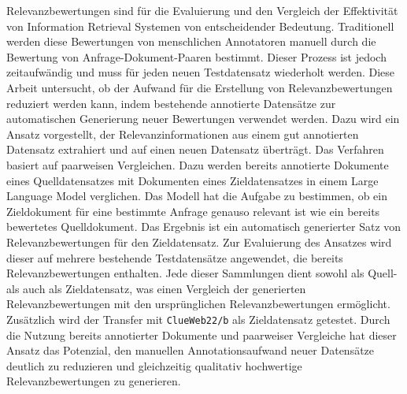 Relevanzbewertungen sind für die Evaluierung und den Vergleich der Effektivität von Information Retrieval Systemen von entscheidender Bedeutung. Traditionell werden diese Bewertungen von menschlichen Annotatoren manuell durch die Bewertung von Anfrage-Dokument-Paaren bestimmt. Dieser Prozess ist jedoch zeitaufwändig und muss für jeden neuen Testdatensatz wiederholt werden. Diese Arbeit untersucht, ob der Aufwand für die Erstellung von Relevanzbewertungen reduziert werden kann, indem bestehende annotierte Datensätze zur automatischen Generierung neuer Bewertungen verwendet werden. Dazu wird ein Ansatz vorgestellt, der Relevanzinformationen aus einem gut annotierten Datensatz extrahiert und auf einen neuen Datensatz überträgt. Das Verfahren basiert auf paarweisen Vergleichen. Dazu werden bereits annotierte Dokumente eines Quelldatensatzes mit Dokumenten eines Zieldatensatzes in einem Large Language Model verglichen. Das Modell hat die Aufgabe zu bestimmen, ob ein Zieldokument für eine bestimmte Anfrage genauso relevant ist wie ein bereits bewertetes Quelldokument. Das Ergebnis ist ein automatisch generierter Satz von Relevanzbewertungen für den Zieldatensatz. Zur Evaluierung des Ansatzes wird dieser auf mehrere bestehende Testdatensätze angewendet, die bereits Relevanzbewertungen enthalten. Jede dieser Sammlungen dient sowohl als Quell- als auch als Zieldatensatz, was einen Vergleich der generierten Relevanzbewertungen mit den ursprünglichen Relevanzbewertungen ermöglicht. Zusätzlich wird der Transfer mit \texttt{ClueWeb22/b} als Zieldatensatz getestet. Durch die Nutzung bereits annotierter Dokumente und paarweiser Vergleiche hat dieser Ansatz das Potenzial, den manuellen Annotationsaufwand neuer Datensätze deutlich zu reduzieren und gleichzeitig qualitativ hochwertige Relevanzbewertungen zu generieren.